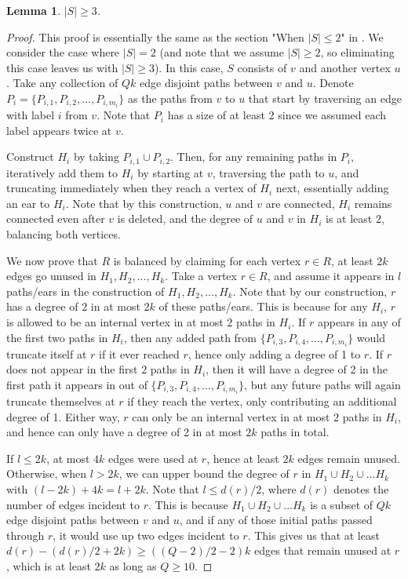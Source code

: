 \documentclass{article}
\newtheorem{lemma}{Lemma}[section]
\begin{document}
\begin{lemma}
    $|S| \geq 3$.
\end{lemma}
\begin{proof}
    This proof is essentially the same as the section "When $|S| \leq 2$" in \cite{lau-thesis}. We consider the case where $|S|=2$ (and note that we assume $|S| \geq 2$, so eliminating this case leaves us with $|S| \geq 3$). In this case, $S$ consists of $v$ and another vertex $u$. Take any collection of $Qk$ edge disjoint paths between $v$ and $u$. Denote $P_i = \{P_{i,1}, P_{i,2},...,P_{i,m_i} \}$ as the paths from $v$ to $u$ that start by traversing an edge with label $i$ from $v$. Note that $P_i$ has a size of at least 2 since we assumed each label appears twice at $v$. 

    Construct $H_i$ by taking $P_{i,1} \cup P_{i,2}$. Then, for any remaining paths in $P_i$, iteratively add them to $H_i$ by starting at $v$, traversing the path to $u$, and truncating immediately when they reach a vertex of $H_i$ next, essentially adding an ear to $H_i$. Note that by this construction, $u$ and $v$ are connected, $H_i$ remains connected even after $v$ is deleted, and the degree of $u$ and $v$ in $H_i$ is at least 2, balancing both vertices. 

    We now prove that $R$ is balanced by claiming for each vertex $r \in R$, at least $2k$ edges go unused in $H_1, H_2,...,H_k$. Take a vertex $r \in R$, and assume it appears in $l$ paths/ears in the construction of $H_1, H_2,...,H_k$. Note that by our construction, $r$ has a degree of 2 in at most $2k$ of these paths/ears. This is because for any $H_i$, $r$ is allowed to be an internal vertex in at most 2 paths in $H_i$. If $r$ appears in any of the first two paths in $H_i$, then any added path from $\{P_{i,3}, P_{i,4},...,P_{i,m_i} \}$ would truncate itself at $r$ if it ever reached $r$, hence only adding a degree of 1 to $r$. If $r$ does not appear in the first 2 paths in $H_i$, then it will have a degree of 2 in the first path it appears in out of $\{P_{i,3}, P_{i,4},...,P_{i,m_i} \}$, but any future paths will again truncate themselves at $r$ if they reach the vertex, only contributing an additional degree of 1. Either way, $r$ can only be an internal vertex in at most 2 paths in $H_i$, and hence can only have a degree of 2 in at most $2k$ paths in total.

    If $l \leq 2k$, at most $4k$ edges were used at $r$, hence at least $2k$ edges remain unused. Otherwise, when $l > 2k$, we can upper bound the degree of $r$ in $H_1 \cup H_2 \cup ...H_k$ with $(l-2k)+4k = l+2k$. Note that $l \leq d(r)/2$, where $d(r)$ denotes the number of edges incident to $r$. This is because $H_1 \cup H_2 \cup...H_k$ is a subset of $Qk$ edge disjoint paths between $v$ and $u$, and if any of those initial paths passed through $r$, it would use up two edges incident to $r$. This gives us that at least $d(r)-(d(r)/2+2k) \geq ((Q-2)/2-2)k$ edges that remain unused at $r$, which is at least $2k$ as long as $Q \geq 10$. 
\end{proof}
\end{document}
